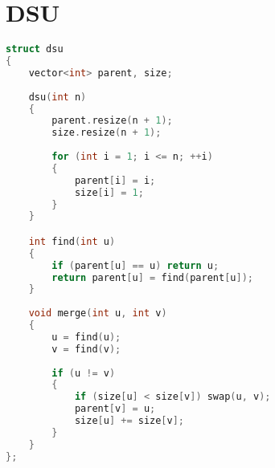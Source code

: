 \section{DSU}
\begin{lstlisting}[language=C++]
struct dsu
{
    vector<int> parent, size;
 
    dsu(int n)
    {
        parent.resize(n + 1);
        size.resize(n + 1);
 
        for (int i = 1; i <= n; ++i)
        {
            parent[i] = i;
            size[i] = 1;
        }
    }

    int find(int u)
    {
        if (parent[u] == u) return u;
        return parent[u] = find(parent[u]);
    }
 
    void merge(int u, int v)
    {
        u = find(u);
        v = find(v);
 
        if (u != v)
        {
            if (size[u] < size[v]) swap(u, v);
            parent[v] = u;
            size[u] += size[v];
        }
    }
};
\end{lstlisting}
\sectionend
